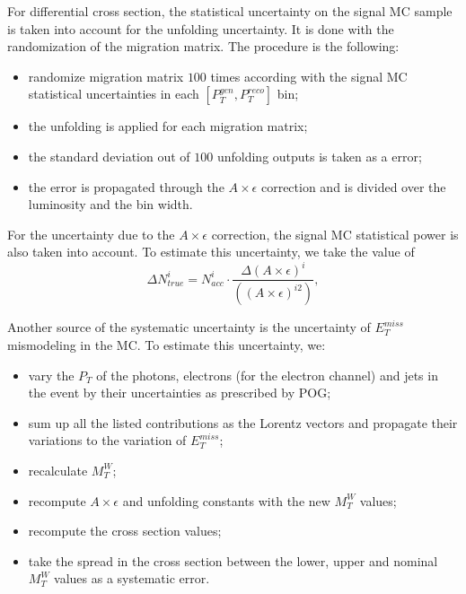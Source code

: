 For differential cross section, the statistical uncertainty on the signal MC sample is taken into account for the unfolding uncertainty. It is done with the randomization of the migration matrix. The procedure is the following:
\begin{itemize}
  \item randomize migration matrix $100$ times according with the signal MC statistical uncertainties in each $[P_T^{gen},P_T^{reco}]$ bin;
  \item the unfolding is applied for each migration matrix;
  \item the standard deviation out of $100$ unfolding outputs is taken as a error;
  \item the error is propagated through the $A\times\epsilon$ correction and is divided over the luminosity and the bin width.
\end{itemize}


For the uncertainty due to the $A \times \epsilon$ correction, the signal MC statistical power is also taken into account. To estimate this uncertainty, we take the value of 
\begin{equation}
\Delta N_{true}^i= N_{acc}^i \cdot \frac{\Delta{(A\times \epsilon)^i}} { ((A\times \epsilon)^{i2})}, 
\end{equation}


Another source of the systematic uncertainty is the uncertainty of $E_T^{miss}$ mismodeling in the MC. To estimate this uncertainty, we:
\begin{itemize}
  \item vary the $P_T$ of the photons, electrons (for the electron channel) and jets in the event by their uncertainties as prescribed by POG;
  \item sum up all the listed contributions as the Lorentz vectors and propagate their variations to the variation of $E_T^{miss}$;
  \item recalculate $M_T^{W}$;
  \item recompute $A \times \epsilon$ and unfolding constants with the new $M_T^{W}$ values;
  \item recompute the cross section values;
  \item take the spread in the cross section between the lower, upper and nominal $M_T^{W}$ values as a systematic error.
\end{itemize}

